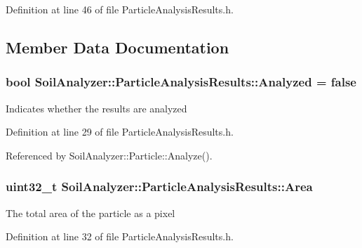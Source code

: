 Definition at line 46 of file Particle\+Analysis\+Results.\+h.



\subsection{Member Data Documentation}
\hypertarget{class_soil_analyzer_1_1_particle_analysis_results_abfb8465c0cfbe9a6ad4d844f6269676f}{}
\subsubsection[{Analyzed}]{\setlength{\rightskip}{0pt plus 5cm}bool Soil\+Analyzer\+::\+Particle\+Analysis\+Results\+::\+Analyzed = false}\label{class_soil_analyzer_1_1_particle_analysis_results_abfb8465c0cfbe9a6ad4d844f6269676f}
Indicates whether the results are analyzed 

Definition at line 29 of file Particle\+Analysis\+Results.\+h.



Referenced by Soil\+Analyzer\+::\+Particle\+::\+Analyze().

\hypertarget{class_soil_analyzer_1_1_particle_analysis_results_a1a6dbe8880b29f51ba3d8ec28b96ed45}{}
\subsubsection[{Area}]{\setlength{\rightskip}{0pt plus 5cm}uint32\+\_\+t Soil\+Analyzer\+::\+Particle\+Analysis\+Results\+::\+Area}\label{class_soil_analyzer_1_1_particle_analysis_results_a1a6dbe8880b29f51ba3d8ec28b96ed45}
The total area of the particle as a pixel 

Definition at line 32 of file Particle\+Analysis\+Results.\+h.

\hypertarget{class_soil_analyzer_1_1_particle_analysis_results_a75230aa0675b2df489c08bcfffb43b97}{}
